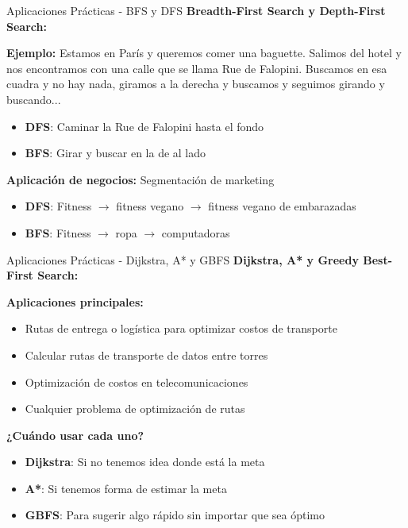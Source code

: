 \documentclass{beamer}
\begin{document}
\begin{frame}{Aplicaciones Prácticas - BFS y DFS}
    \textbf{Breadth-First Search y Depth-First Search:}
    
    \vspace{0.3cm}
    
    \textbf{Ejemplo:} Estamos en París y queremos comer una baguette. Salimos del hotel y nos encontramos con una calle que se llama Rue de Falopini. Buscamos en esa cuadra y no hay nada, giramos a la derecha y buscamos y seguimos girando y buscando...
    
    \vspace{0.3cm}
    
    \begin{itemize}
        \item \textbf{DFS}: Caminar la Rue de Falopini hasta el fondo
        \item \textbf{BFS}: Girar y buscar en la de al lado
    \end{itemize}
    
    \vspace{0.3cm}
    
    \textbf{Aplicación de negocios:} Segmentación de marketing
    \begin{itemize}
        \item \textbf{DFS}: Fitness $\rightarrow$ fitness vegano $\rightarrow$ fitness vegano de embarazadas
        \item \textbf{BFS}: Fitness $\rightarrow$ ropa $\rightarrow$ computadoras
    \end{itemize}
\end{frame}

\begin{frame}{Aplicaciones Prácticas - Dijkstra, A* y GBFS}
    \textbf{Dijkstra, A* y Greedy Best-First Search:}
    
    \vspace{0.3cm}
    
    \textbf{Aplicaciones principales:}
    \begin{itemize}
        \item Rutas de entrega o logística para optimizar costos de transporte
        \item Calcular rutas de transporte de datos entre torres
        \item Optimización de costos en telecomunicaciones
        \item Cualquier problema de optimización de rutas
    \end{itemize}
    
    \vspace{0.3cm}
    
    \textbf{¿Cuándo usar cada uno?}
    \begin{itemize}
        \item \textbf{Dijkstra}: Si no tenemos idea donde está la meta
        \item \textbf{A*}: Si tenemos forma de estimar la meta
        \item \textbf{GBFS}: Para sugerir algo rápido sin importar que sea óptimo
    \end{itemize}
\end{frame}
\end{document}

